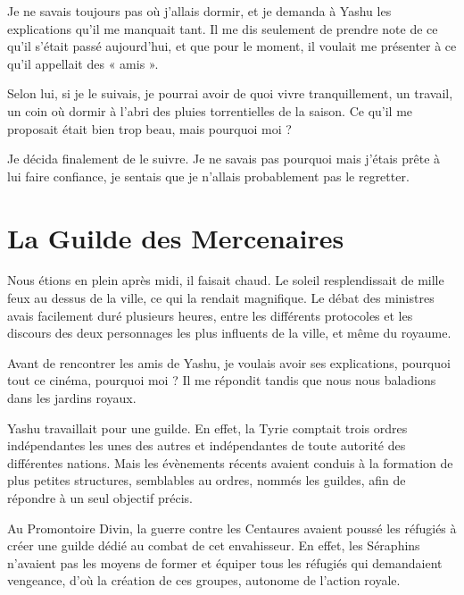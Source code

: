 \documentclass{book}
\begin{document}
Je ne savais toujours pas où j'allais dormir, et je demanda à Yashu les explications qu'il me manquait tant. Il me dis seulement de prendre note de ce qu'il s'était passé aujourd'hui, et que pour le moment, il voulait me présenter à ce qu'il appellait des « amis ».\newline

Selon lui, si je le suivais, je pourrai avoir de quoi vivre tranquillement, un travail, un coin où dormir à l'abri des pluies torrentielles de la saison. Ce qu'il me proposait était bien trop beau, mais pourquoi moi ?\newline

Je décida finalement de le suivre. Je ne savais pas pourquoi mais j'étais prête à lui faire confiance, je sentais que je n'allais probablement pas le regretter.\newline

\chapter{La Guilde des Mercenaires}
Nous étions en plein après midi, il faisait chaud. Le soleil resplendissait de mille feux au dessus de la ville, ce qui la rendait magnifique. Le débat des ministres avais facilement duré plusieurs heures, entre les différents protocoles et les discours des deux personnages les plus influents de la ville, et même du royaume.\newline

Avant de rencontrer les amis de Yashu, je voulais avoir ses explications, pourquoi tout ce cinéma, pourquoi moi ? Il me répondit tandis que nous nous baladions dans les jardins royaux.\newline

Yashu travaillait pour  une guilde. En effet, la Tyrie comptait trois ordres indépendantes les unes des autres et indépendantes de toute autorité des différentes nations. Mais les évènements récents avaient conduis à la formation de plus petites structures, semblables au ordres, nommés les guildes, afin de répondre à un seul objectif précis.\newline

Au Promontoire Divin, la guerre contre les Centaures avaient poussé les réfugiés à créer une guilde dédié au combat de cet envahisseur. En effet, les Séraphins n'avaient pas les moyens de former et équiper tous les réfugiés qui demandaient vengeance, d'où la création de ces groupes, autonome de l'action royale.\newline
\end{document}
